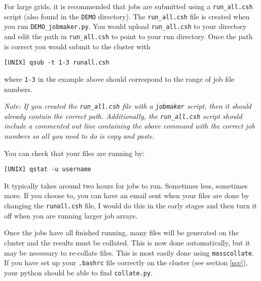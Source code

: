 \documentclass{article}
\begin{document}
For large grids, it is recommended that jobs are submitted using a \texttt{run\_all.csh} script (also found in the \texttt{DEMO} directory). 
The \texttt{run\_all.csh} file is created when you run  \texttt{DEMO\_jobmaker.py}. 
You would upload \texttt{run\_all.csh} to your directory and edit the path in \texttt{run\_all.csh} to point to your run directory.  Once the path is correct you would submit to the cluster with

\vspace{2mm}
\texttt{[UNIX] qsub -t 1-3 runall.csh}
\vspace{2mm}

\noindent where \texttt{1-3} in the example above should correspond to the range of job file numbers. 
\vspace{2mm}

\noindent \textit{Note: If you created the \texttt{run\_all.csh} file with a \texttt{jobmaker} script, then it should already contain the correct path. Additionally, the \texttt{run\_all.csh} script should include a commented out line containing the above command with the correct job numbers so all you need to do is copy and paste.}
\vspace{2mm}

You can check that your files are running by: 

\vspace{2mm}
\texttt{[UNIX] qstat -u username}
\vspace{2mm}

It typically takes around two hours for jobs to run. Sometimes less, sometimes more. If you choose to, you can have an email sent when your files are done by changing the \texttt{runall.csh} file, I would do this in the early stages and then turn it off when you are running larger job arrays. 

\noindent Once the jobs have all finished running, many files will be generated on the cluster and the results must be collated. This is now done automatically, but it may be necessary to re-collate files. This is most easily done using \texttt{masscollate}. If you have set up your \texttt{.bashrc} file correctly on the cluster (see section \ref{scc}), your python should be able to find \texttt{collate.py}.





\end{document}
